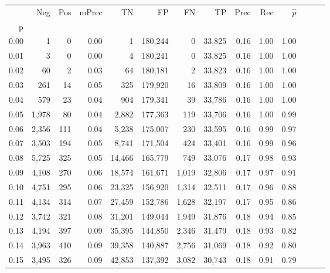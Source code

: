 \begin{tabular}{rrrrrrrrrrrrrr}
\toprule
{} &    Neg &    Pos & mPrec &       TN &       FP &      FN &      TP &  Prec &   Rec & $\hat{p}$ \\
p    &        &        &       &          &          &         &         &       &       &           \\
\midrule
0.00 &      1 &      0 &  0.00 &        1 &  180,244 &       0 &  33,825 &  0.16 &  1.00 &      1.00 \\
0.01 &      3 &      0 &  0.00 &        4 &  180,241 &       0 &  33,825 &  0.16 &  1.00 &      1.00 \\
0.02 &     60 &      2 &  0.03 &       64 &  180,181 &       2 &  33,823 &  0.16 &  1.00 &      1.00 \\
0.03 &    261 &     14 &  0.05 &      325 &  179,920 &      16 &  33,809 &  0.16 &  1.00 &      1.00 \\
0.04 &    579 &     23 &  0.04 &      904 &  179,341 &      39 &  33,786 &  0.16 &  1.00 &      1.00 \\
0.05 &  1,978 &     80 &  0.04 &    2,882 &  177,363 &     119 &  33,706 &  0.16 &  1.00 &      0.99 \\
0.06 &  2,356 &    111 &  0.04 &    5,238 &  175,007 &     230 &  33,595 &  0.16 &  0.99 &      0.97 \\
0.07 &  3,503 &    194 &  0.05 &    8,741 &  171,504 &     424 &  33,401 &  0.16 &  0.99 &      0.96 \\
0.08 &  5,725 &    325 &  0.05 &   14,466 &  165,779 &     749 &  33,076 &  0.17 &  0.98 &      0.93 \\
0.09 &  4,108 &    270 &  0.06 &   18,574 &  161,671 &   1,019 &  32,806 &  0.17 &  0.97 &      0.91 \\
0.10 &  4,751 &    295 &  0.06 &   23,325 &  156,920 &   1,314 &  32,511 &  0.17 &  0.96 &      0.88 \\
0.11 &  4,134 &    314 &  0.07 &   27,459 &  152,786 &   1,628 &  32,197 &  0.17 &  0.95 &      0.86 \\
0.12 &  3,742 &    321 &  0.08 &   31,201 &  149,044 &   1,949 &  31,876 &  0.18 &  0.94 &      0.85 \\
0.13 &  4,194 &    397 &  0.09 &   35,395 &  144,850 &   2,346 &  31,479 &  0.18 &  0.93 &      0.82 \\
0.14 &  3,963 &    410 &  0.09 &   39,358 &  140,887 &   2,756 &  31,069 &  0.18 &  0.92 &      0.80 \\
0.15 &  3,495 &    326 &  0.09 &   42,853 &  137,392 &   3,082 &  30,743 &  0.18 &  0.91 &      0.79 \\

\end{tabular}
